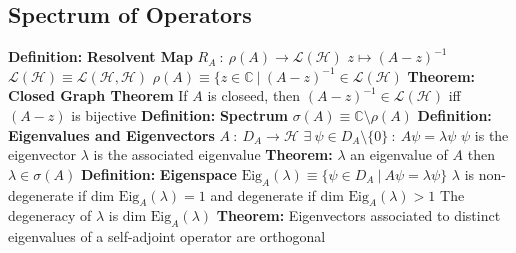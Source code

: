 \documentclass[14pt]{extarticle}
\def\Definition{{\color{blue} \textbf{Definition:} }}
\def\Theorem{{\color{red} \textbf{Theorem:} }}
\begin{document}
\begin{outline}
	\section*{Spectrum of Operators}
		\1	\Definition \textbf{Resolvent Map}
			\2	$R_A~:~\rho(A) \rightarrow \mathcal{L}(\mathcal{H})$
			\2	$z \mapsto (A - z)^{-1}$
			\2	$\mathcal{L}(\mathcal{H}) \equiv \mathcal{L}(\mathcal{H},\mathcal{H})$
			\2	$\rho(A) \equiv \{z \in \mathbb{C}~|~(A - z)^{-1} \in \mathcal{L}(\mathcal{H})$
		\1	\Theorem \textbf{Closed Graph Theorem}
			\2	If $A$ is closeed, then $(A - z)^{-1} \in \mathcal{L}(\mathcal{H})$
					iff $(A - z)$ is bijective
		\1	\Definition \textbf{Spectrum}
			\2	$\sigma(A) \equiv \mathbb{C} \setminus \rho(A)$
		\1	\Definition \textbf{Eigenvalues and Eigenvectors}
			\2	$A~:~D_A \rightarrow \mathcal{H}$
			\2	$\exists~\psi \in D_A \setminus \{0\}~:~A\psi = \lambda \psi$
			\2	$\psi$ is the eigenvector
			\2	$\lambda$ is the associated eigenvalue
		\1	\Theorem $\lambda$ an eigenvalue of $A$ then $\lambda \in \sigma(A)$
		\1	\Definition \textbf{Eigenspace}
			\2	$\text{Eig}_A(\lambda) \equiv \{\psi \in D_A~|~A\psi = \lambda \psi\}$
			\2	$\lambda$ is non-degenerate if $\text{dim Eig}_A(\lambda) = 1$ and 
					degenerate if $\text{dim Eig}_A(\lambda) > 1$
			\2	The degeneracy of $\lambda$ is $\text{dim Eig}_A(\lambda)$
		\1	\Theorem Eigenvectors associated to distinct eigenvalues of a self-adjoint
				operator are orthogonal
	\end{outline}
\end{document}
